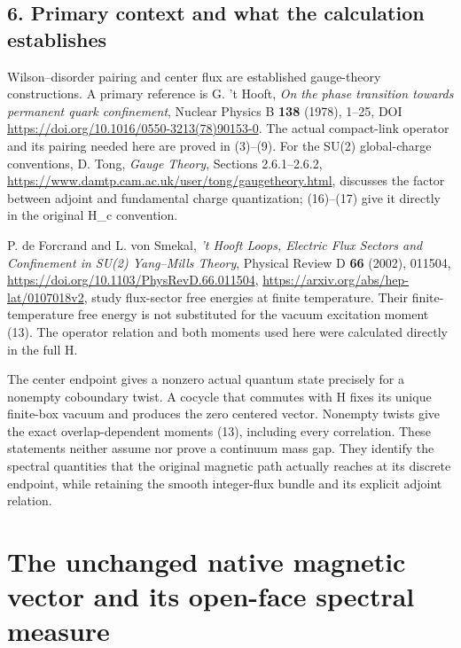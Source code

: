 \documentclass[
  11pt,
]{article}
\begin{document}
\subsection{6. Primary context and what the calculation
establishes}\label{magnetic-part-7-primary-context-and-what-the-calculation-establishes}

Wilson--disorder pairing and center flux are established gauge-theory
constructions. A primary reference is G. 't Hooft, \emph{On the phase
transition towards permanent quark confinement}, Nuclear Physics B
\textbf{138} (1978), 1--25, DOI
\url{https://doi.org/10.1016/0550-3213(78)90153-0}. The actual
compact-link operator and its pairing needed here are proved in
(3)--(9). For the SU(2) global-charge conventions, D. Tong, \emph{Gauge
Theory}, Sections 2.6.1--2.6.2,
\url{https://www.damtp.cam.ac.uk/user/tong/gaugetheory.html}, discusses
the factor between adjoint and fundamental charge quantization;
(16)--(17) give it directly in the original H\_c convention.

P. de Forcrand and L. von Smekal, \emph{'t Hooft Loops, Electric Flux
Sectors and Confinement in SU(2) Yang--Mills Theory}, Physical Review D
\textbf{66} (2002), 011504,
\url{https://doi.org/10.1103/PhysRevD.66.011504},
\url{https://arxiv.org/abs/hep-lat/0107018v2}, study flux-sector free
energies at finite temperature. Their finite-temperature free energy is
not substituted for the vacuum excitation moment (13). The operator
relation and both moments used here were calculated directly in the full
H.

The center endpoint gives a nonzero actual quantum state precisely for a
nonempty coboundary twist. A cocycle that commutes with H fixes its
unique finite-box vacuum and produces the zero centered vector. Nonempty
twists give the exact overlap-dependent moments (13), including every
correlation. These statements neither assume nor prove a continuum mass
gap. They identify the spectral quantities that the original magnetic
path actually reaches at its discrete endpoint, while retaining the
smooth integer-flux bundle and its explicit adjoint relation.

\clearpage
\section{The unchanged native magnetic vector and its open-face spectral
measure}\label{magnetic-part-8-the-unchanged-native-magnetic-vector-and-its-open-face-spectral-measure}
\end{document}
